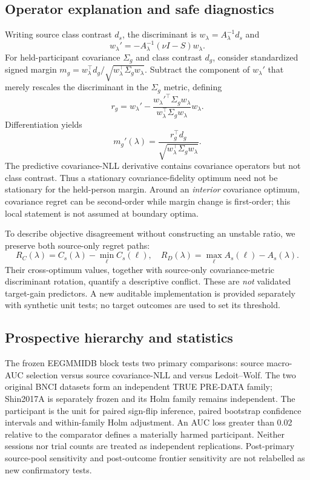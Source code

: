 \documentclass[11pt,a4paper]{article}
\begin{document}
\subsection{Operator explanation and safe diagnostics}
Writing source class contrast \(d_s\), the discriminant is
\(w_\lambda=A_\lambda^{-1}d_s\) and
\[
 w_\lambda'=-A_\lambda^{-1}(\nu I-S)w_\lambda.
\]
For held-participant covariance \(\Sigma_g\) and class contrast \(d_g\),
consider standardized signed margin
\(m_g=w_\lambda^\top d_g/\sqrt{w_\lambda^\top\Sigma_gw_\lambda}\).
Subtract the component of \(w_\lambda'\) that merely rescales the
discriminant in the \(\Sigma_g\) metric, defining
\[
 r_g=w_\lambda'-
 \frac{w_\lambda'^\top\Sigma_gw_\lambda}
 {w_\lambda^\top\Sigma_gw_\lambda}w_\lambda.
\]
Differentiation yields
\[
 m_g'(\lambda)=
 \frac{r_g^\top d_g}{\sqrt{w_\lambda^\top\Sigma_gw_\lambda}}.
\]
The predictive covariance-NLL derivative contains covariance operators but
not class contrast. Thus a stationary covariance-fidelity optimum need not
be stationary for the held-person margin. Around an \emph{interior} covariance
optimum, covariance regret can be second-order while margin change is
first-order; this local statement is not assumed at boundary optima.

To describe objective disagreement without constructing an unstable ratio,
we preserve both source-only regret paths:
\[
 R_C(\lambda)=C_s(\lambda)-\min_\ell C_s(\ell),\quad
 R_D(\lambda)=\max_\ell A_s(\ell)-A_s(\lambda).
\]
Their cross-optimum values, together with source-only covariance-metric
discriminant rotation, quantify a descriptive conflict.
These are \emph{not} validated target-gain predictors. A new auditable
implementation is provided separately with synthetic unit tests; no
target outcomes are used to set its threshold.

\subsection{Prospective hierarchy and statistics}
The frozen EEGMMIDB block tests two primary comparisons: source macro-AUC
selection versus source covariance-NLL and versus Ledoit--Wolf.
The two original BNCI datasets form an independent TRUE PRE-DATA family;
Shin2017A is separately frozen and its Holm family remains independent.
The participant is the unit for paired sign-flip inference, paired bootstrap
confidence intervals and within-family Holm adjustment. An AUC loss
greater than 0.02 relative to the comparator defines a materially harmed
participant. Neither sessions nor trial counts are treated as independent
replications. Post-primary source-pool sensitivity and post-outcome frontier
sensitivity are not relabelled as new confirmatory tests.
\end{document}
